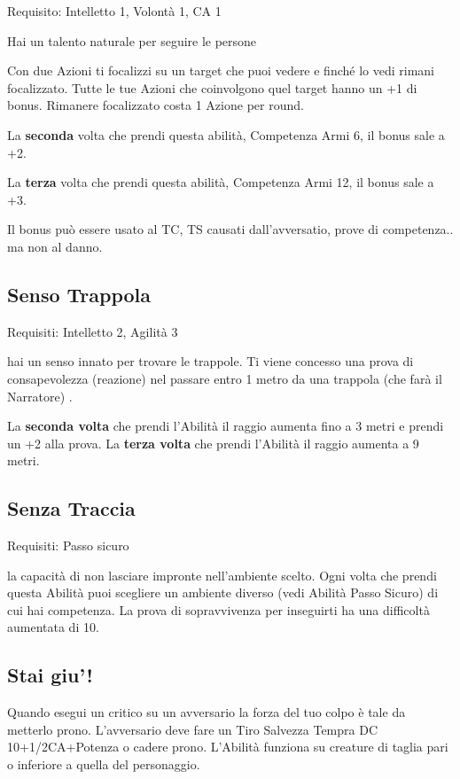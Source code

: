 \documentclass[a4paper,11pt,twoside,openany]{book}
\begin{document}
Requisito: Intelletto 1, Volontà 1, CA 1

Hai un talento naturale per seguire le persone

Con due Azioni ti focalizzi su un target che puoi vedere e finché lo vedi rimani focalizzato. Tutte le tue Azioni che coinvolgono quel target hanno un +1 di bonus. Rimanere focalizzato costa 1 Azione per round.

La \textbf{seconda} volta che prendi questa abilità, Competenza Armi 6, il bonus sale a +2.

La \textbf{terza} volta che prendi questa abilità, Competenza Armi 12, il bonus sale a +3.

Il bonus può essere usato al TC, TS causati dall'avversatio, prove di competenza.. ma non al danno.

\subsection{Senso Trappola}

Requisiti: Intelletto 2, Agilità 3

hai un senso innato per trovare le trappole. Ti viene concesso una prova di consapevolezza (reazione) nel passare entro 1 metro da una trappola (che farà il Narratore) .

La \textbf{seconda volta} che prendi l'Abilità il raggio aumenta fino a 3 metri e prendi un +2 alla prova. La \textbf{terza volta} che prendi l'Abilità il raggio aumenta a 9 metri.

\subsection{Senza Traccia}

Requisiti: Passo sicuro

la capacità di non lasciare impronte nell'ambiente scelto. Ogni volta che prendi questa Abilità puoi scegliere un ambiente diverso (vedi Abilità Passo Sicuro) di cui hai competenza. La prova di sopravvivenza per inseguirti ha una difficoltà aumentata di 10.

\subsection{Stai giu'!}

Quando esegui un critico su un avversario la forza del tuo colpo è tale da metterlo prono. L'avversario deve fare un Tiro Salvezza Tempra DC 10+1/2CA+Potenza o cadere prono. L'Abilità funziona su creature di taglia pari o inferiore a quella del personaggio.
\end{document}
